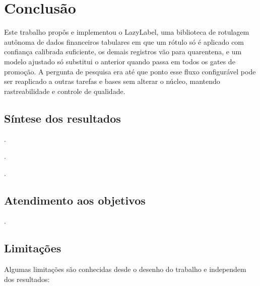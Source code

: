 \chapter{Conclusão}
\label{cap:conclusao}


Este trabalho propôs e implementou o LazyLabel, uma biblioteca de rotulagem autônoma de dados financeiros tabulares em que um rótulo só é aplicado com confiança calibrada suficiente, os demais registros vão para quarentena, e um modelo ajustado só substitui o anterior quando passa em todos os gates de promoção. A pergunta de pesquisa era até que ponto esse fluxo configurável pode ser reaplicado a outras tarefas e bases sem alterar o núcleo, mantendo rastreabilidade e controle de qualidade.

\section{Síntese dos resultados}

.

.

.

\section{Atendimento aos objetivos}

.

\section{Limitações}

Algumas limitações são conhecidas desde o desenho do trabalho e independem dos resultados:

